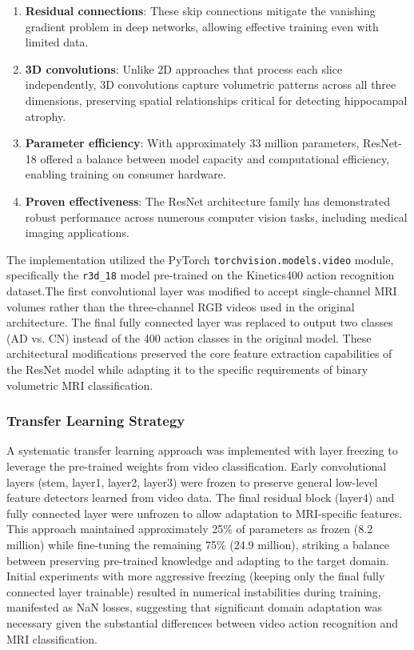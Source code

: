 \documentclass[12pt, a4paper]{article}
\begin{document}
\begin{enumerate}
    \item \textbf{Residual connections}: These skip connections mitigate the vanishing gradient problem in deep networks, allowing effective training even with limited data.
    
    \item \textbf{3D convolutions}: Unlike 2D approaches that process each slice independently, 3D convolutions capture volumetric patterns across all three dimensions, preserving spatial relationships critical for detecting hippocampal atrophy.
    
    \item \textbf{Parameter efficiency}: With approximately 33 million parameters, ResNet-18 offered a balance between model capacity and computational efficiency, enabling training on consumer hardware.
    
    \item \textbf{Proven effectiveness}: The ResNet architecture family has demonstrated robust performance across numerous computer vision tasks, including medical imaging applications.
\end{enumerate}


The implementation utilized the PyTorch \texttt{torchvision.models.video} module, specifically the \texttt{r3d\_18} model pre-trained on the Kinetics400 action recognition dataset.The first convolutional layer was modified to accept single-channel MRI volumes rather than the three-channel RGB videos used in the original architecture. The final fully connected layer was replaced to output two classes (AD vs. CN) instead of the 400 action classes in the original model. These architectural modifications preserved the core feature extraction capabilities of the ResNet model while adapting it to the specific requirements of binary volumetric MRI classification.

\subsubsection{Transfer Learning Strategy}

A systematic transfer learning approach was implemented with layer freezing to leverage the pre-trained weights from video classification. Early convolutional layers (stem, layer1, layer2, layer3) were frozen to preserve general low-level feature detectors learned from video data. The final residual block (layer4) and fully connected layer were unfrozen to allow adaptation to MRI-specific features. This approach maintained approximately 25\% of parameters as frozen (8.2 million) while fine-tuning the remaining 75\% (24.9 million), striking a balance between preserving pre-trained knowledge and adapting to the target domain. Initial experiments with more aggressive freezing (keeping only the final fully connected layer trainable) resulted in numerical instabilities during training, manifested as NaN losses, suggesting that significant domain adaptation was necessary given the substantial differences between video action recognition and MRI classification.
\end{document}
